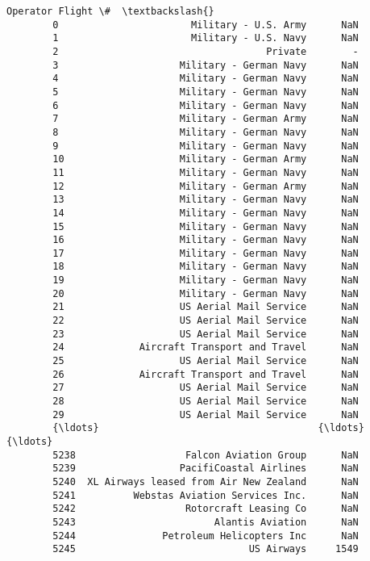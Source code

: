 \documentclass[11pt]{article}
\begin{document}
\begin{Verbatim}[commandchars=\\\{\}]
                                            Operator Flight \#  \textbackslash{}
        0                       Military - U.S. Army      NaN   
        1                       Military - U.S. Navy      NaN   
        2                                    Private        -   
        3                     Military - German Navy      NaN   
        4                     Military - German Navy      NaN   
        5                     Military - German Navy      NaN   
        6                     Military - German Navy      NaN   
        7                     Military - German Army      NaN   
        8                     Military - German Navy      NaN   
        9                     Military - German Navy      NaN   
        10                    Military - German Army      NaN   
        11                    Military - German Navy      NaN   
        12                    Military - German Army      NaN   
        13                    Military - German Navy      NaN   
        14                    Military - German Navy      NaN   
        15                    Military - German Navy      NaN   
        16                    Military - German Navy      NaN   
        17                    Military - German Navy      NaN   
        18                    Military - German Navy      NaN   
        19                    Military - German Navy      NaN   
        20                    Military - German Navy      NaN   
        21                    US Aerial Mail Service      NaN   
        22                    US Aerial Mail Service      NaN   
        23                    US Aerial Mail Service      NaN   
        24             Aircraft Transport and Travel      NaN   
        25                    US Aerial Mail Service      NaN   
        26             Aircraft Transport and Travel      NaN   
        27                    US Aerial Mail Service      NaN   
        28                    US Aerial Mail Service      NaN   
        29                    US Aerial Mail Service      NaN   
        {\ldots}                                      {\ldots}      {\ldots}   
        5238                   Falcon Aviation Group      NaN   
        5239                  PacifiCoastal Airlines      NaN   
        5240  XL Airways leased from Air New Zealand      NaN   
        5241          Webstas Aviation Services Inc.      NaN   
        5242                   Rotorcraft Leasing Co      NaN   
        5243                        Alantis Aviation      NaN   
        5244               Petroleum Helicopters Inc      NaN   
        5245                              US Airways     1549   

\end{Verbatim}
\end{document}
